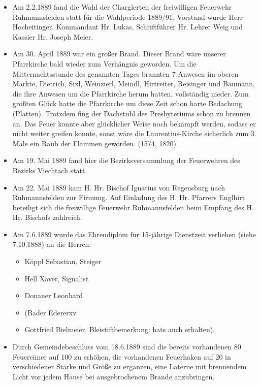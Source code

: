 \documentclass[12pt,a4paper]{book}
\begin{document}
\begin{itemize}
\item Am 2.2.1889 fand die Wahl der Chargierten der freiwilligen
Feuerwehr Ruhmannsfelden statt für die Wahlperiode 1889/91. Vorstand
wurde Herr Hocheitinger, Kommandant Hr. Lukas, Schriftführer Hr. Lehrer
Weig und Kassier Hr. Joseph Meier.

\item Am 30. April 1889 war ein großer Brand. Dieser Brand wäre unserer
Pfarrkirche bald wieder zum Verhängnis geworden. Um die
Mitternachtsstunde des genannten Tages brannten 7 Anwesen im oberen
Markte, Dietrich, Sixl, Weinzierl, Meindl, Hirtreiter, Reisinger und
Baumann, die ihre Anwesen um die Pfarrkirche herum hatten, vollständig
nieder. Zum größten Glück hatte die Pfarrkirche um diese Zeit schon
harte Bedachung (Platten). Trotzdem fing der Dachstuhl des Presbyteriums
schon zu brennen an. Das Feuer konnte aber glücklicher Weise noch
bekämpft werden, sodass er nicht weiter greifen konnte, sonst wäre die
Laurentius-Kirche sicherlich zum 3. Male ein Raub der Flammen geworden.
(1574, 1820)

\item Am 19. Mai 1889 fand hier die Bezirksversammlung der Feuerwehren
des Bezirks Viechtach statt.

\item Am 22. Mai 1889 kam H. Hr. Bischof Ignatius von Regensburg nach
Ruhmannsfelden zur Firmung. Auf Einladung des H. Hr. Pfarrers Englhirt
beteiligt sich die freiwillige Feuerwehr Ruhmannsfelden beim Empfang des
H. Hr. Bischofs zahlreich.

\item Am 7.6.1889 wurde das Ehrendiplom für 15-jährige Dienstzeit
verliehen (siehe 7.10.1888) an die Herren:

\begin{itemize}
\item Köppl Sebastian, Steiger
\item Hell Xaver, Signalist
\item Donauer Leonhard
\item (Bader Edererxv
\item Gottfried Bielmeier, Bleistiftbemerkung: hats auch erhalten).
\end{itemize}

\item Durch Gemeindebeschluss vom 18.6.1889 sind die bereits vorhandenen
80 Feuereimer auf 100 zu erhöhen, die vorhandenen Feuerhaken auf 20 in
verschiedener Stärke und Größe zu ergänzen, eine Laterne mit brennendem
Licht vor jedem Hause bei ausgebrochenem Brande anzubringen.


\end{itemize}
\end{document}

